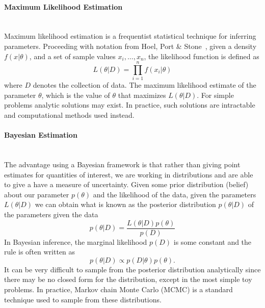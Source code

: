 \paragraph{Maximum Likelihood Estimation} ~\\
\noindent Maximum likelihood estimation is a frequentist statistical technique for inferring parameters. Proceeding with notation from Hoel, Port \& Stone~\cite{hoel1971introduction}, given a density $f(x|\theta)$, and a set of sample values $x_i,\ldots,x_n$, the likelihood function is defined as  
	\begin{equation}
		L(\theta|D) = \prod_{i=1}^{n}f(x_i|\theta)
	\end{equation}
where $D$ denotes the collection of data. The maximum likelihood estimate of the parameter $\theta$, which is the value of $\theta$ that maximizes $L(\theta|D)$. For simple problems analytic solutions may exist. In practice, such solutions are intractable and computational methods used instead.

\paragraph{Bayesian Estimation}~\\
\noindent The advantage using a Bayesian framework is that rather than giving point estimates for quantities of interest, we are working in distributions and are able to give a have a measure of uncertainty. Given some prior distribution (belief) about our parameter $p(\theta)$ and the likelihood of the data, given the parameters $L(\theta|D)$ we can obtain what is known as the posterior distribution $ p(\theta|D)$ of the parameters given the data 
    \begin{equation}
        p(\theta|D) = \frac{L(\theta|D)p(\theta)}{p(D)}
    \end{equation}
In Bayesian inference, the marginal likelihood $p(D)$ is some constant and the rule is often written as 
    \begin{equation}
        p(\theta|D) \propto p(D|\theta)p(\theta).
    \end{equation}
It can be very difficult to sample from the posterior distribution analytically since there may be no closed form for the distribution, except in the most simple toy problems. In practice, Markov chain Monte Carlo (MCMC) is a standard technique used to sample from these distributions. 


